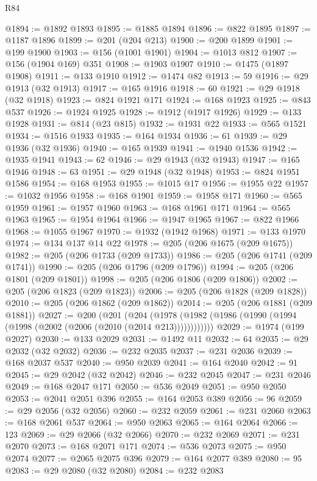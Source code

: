 \begin{lexlean}{R84}
\begin{coremodule}
@1894 := @1892 @1893
@1895 := @1885 @1894
@1896 := @822 @1895
@1897 := @1187 @1896
@1899 := @201 (@204 @213)
@1900 := @200 @1899
@1901 := @199 @1900
@1903 := @156 (@1001 @1901)
@1904 := @1013 @812
@1907 := @156 (@1904 @169) @351
@1908 := @1903 @1907
@1910 := @1475 (@1897 @1908)
@1911 := @133 @1910
@1912 := @1474 @82
@1913 := 59
@1916 := @29 @1913 (@32 @1913)
@1917 := @165 @1916
@1918 := 60
@1921 := @29 @1918 (@32 @1918)
@1923 := @824 @1921 @171
@1924 := @168 @1923
@1925 := @843 @537
@1926 := @1924 @1925
@1928 := @1912 (@1917 @1926)
@1929 := @133 @1928
@1931 := @814 (@23 @815)
@1932 := @1931 @22
@1933 := @565 @1521
@1934 := @1516 @1933
@1935 := @164 @1934
@1936 := 61
@1939 := @29 @1936 (@32 @1936)
@1940 := @165 @1939
@1941 := @1940 @1536
@1942 := @1935 @1941
@1943 := 62
@1946 := @29 @1943 (@32 @1943)
@1947 := @165 @1946
@1948 := 63
@1951 := @29 @1948 (@32 @1948)
@1953 := @824 @1951 @1586
@1954 := @168 @1953
@1955 := @1015 @17
@1956 := @1955 @22
@1957 := @1032 @1956
@1958 := @168 @1901
@1959 := @1958 @171
@1960 := @565 @1959
@1961 := @1957 @1960
@1963 := @168 @1961 @171
@1964 := @565 @1963
@1965 := @1954 @1964
@1966 := @1947 @1965
@1967 := @822 @1966
@1968 := @1055 @1967
@1970 := @1932 (@1942 @1968)
@1971 := @133 @1970
@1974 := @134 @137 @14 @22
@1978 := @205 (@206 @1675 (@209 @1675))
@1982 := @205 (@206 @1733 (@209 @1733))
@1986 := @205 (@206 @1741 (@209 @1741))
@1990 := @205 (@206 @1796 (@209 @1796))
@1994 := @205 (@206 @1801 (@209 @1801))
@1998 := @205 (@206 @1806 (@209 @1806))
@2002 := @205 (@206 @1823 (@209 @1823))
@2006 := @205 (@206 @1828 (@209 @1828))
@2010 := @205 (@206 @1862 (@209 @1862))
@2014 := @205 (@206 @1881 (@209 @1881))
@2027 := @200
    (@201
      (@204 (@1978 (@1982 (@1986 (@1990 (@1994 (@1998 (@2002 (@2006 (@2010 (@2014 @213))))))))))))
@2029 := @1974 (@199 @2027)
@2030 := @133 @2029
@2031 := @1492 @11
@2032 := 64
@2035 := @29 @2032 (@32 @2032)
@2036 := @232 @2035
@2037 := @231 @2036
@2039 := @168 @2037 @537
@2040 := @950 @2039
@2041 := @164 @2040
@2042 := 91
@2045 := @29 @2042 (@32 @2042)
@2046 := @232 @2045
@2047 := @231 @2046
@2049 := @168 @2047 @171
@2050 := @536 @2049
@2051 := @950 @2050
@2053 := @2041 @2051 @396
@2055 := @164 @2053 @389
@2056 := 96
@2059 := @29 @2056 (@32 @2056)
@2060 := @232 @2059
@2061 := @231 @2060
@2063 := @168 @2061 @537
@2064 := @950 @2063
@2065 := @164 @2064
@2066 := 123
@2069 := @29 @2066 (@32 @2066)
@2070 := @232 @2069
@2071 := @231 @2070
@2073 := @168 @2071 @171
@2074 := @536 @2073
@2075 := @950 @2074
@2077 := @2065 @2075 @396
@2079 := @164 @2077 @389
@2080 := 95
@2083 := @29 @2080 (@32 @2080)
@2084 := @232 @2083

\end{coremodule}
\end{lexlean}
